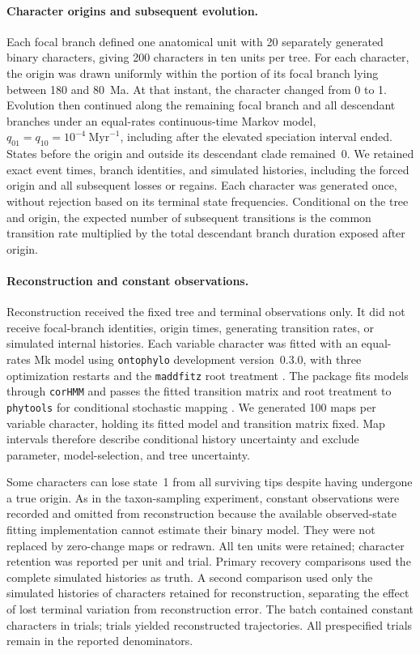 \paragraph{Character origins and subsequent evolution.}
Each focal branch defined one anatomical unit with 20 separately generated
binary characters, giving 200 characters in ten units per tree. For each
character, the origin was drawn uniformly within the portion of its focal
branch lying between 180 and 80~Ma. At that instant, the character changed
from 0 to 1. Evolution then continued along the remaining focal branch and
all descendant branches under an equal-rates continuous-time Markov model,
$q_{01}=q_{10}=10^{-4}~\mathrm{Myr}^{-1}$, including after the elevated
speciation interval ended. States before the origin and outside its
descendant clade remained~0. We retained exact event times, branch identities,
and simulated histories, including the forced origin and all subsequent
losses or regains. Each character was generated once, without rejection
based on its terminal state frequencies. Conditional on the tree and origin,
the expected number of subsequent transitions is the common transition rate
multiplied by the total descendant branch duration exposed after origin.

\paragraph{Reconstruction and constant observations.}
Reconstruction received the fixed tree and terminal observations only.
It did not receive focal-branch identities, origin times, generating transition
rates, or simulated internal histories. Each variable character was fitted
with an equal-rates Mk model using \texttt{ontophylo} development version~0.3.0,
with three optimization restarts and the \texttt{maddfitz} root treatment
\citep{fitzjohn2009}. The package fits models through \texttt{corHMM} and
passes the fitted transition matrix and root treatment to \texttt{phytools}
for conditional stochastic mapping \citep{corHMM,revell2024}.
We generated 100 maps per variable character, holding its fitted model and
transition matrix fixed. Map intervals therefore describe conditional
history uncertainty and exclude parameter, model-selection, and tree uncertainty.

Some characters can lose state~1 from all surviving tips despite having
undergone a true origin. As in the taxon-sampling experiment, constant
observations were recorded and omitted from reconstruction because the
available observed-state fitting implementation cannot estimate their
binary model. They were not replaced by zero-change maps or redrawn.
All ten units were retained; character retention was reported per unit and
trial. Primary recovery comparisons used the complete simulated histories
as truth. A second comparison used only the simulated histories of characters
retained for reconstruction, separating the effect of lost terminal
variation from reconstruction error. The batch contained
\NeffConstantCharacters{} constant characters in \NeffConstantTrials{}
trials; \NeffReconstructedTrials{} trials yielded reconstructed trajectories.
All prespecified trials remain in the reported denominators.

